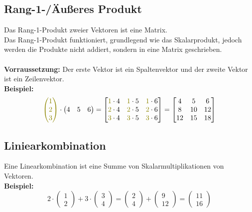\documentclass[12pt,a4paper]{article}
\begin{document}
\subsection{Rang-1-/Äußeres Produkt}
Das Rang-1-Produkt zweier Vektoren ist eine Matrix. \\
Das Rang-1-Produkt funktioniert, grundlegend wie das Skalarprodukt, jedoch werden die Produkte nicht addiert, sondern in eine Matrix geschrieben. \\ \\
\textbf{Vorraussetzung:} Der erste Vektor ist ein Spaltenvektor und der zweite Vektor ist ein Zeilenvektor. \\
\textbf{Beispiel:}
\[
    \textcolor{olive}{
    \begin{pmatrix}
        1 \\
        2 \\
        3
    \end{pmatrix}
    }
    \cdot
    \begin{pmatrix}
        4 & 5 & 6
    \end{pmatrix}
    =
    \begin{bmatrix}
        \textcolor{olive}{1} \cdot 4 & \textcolor{olive}{1} \cdot 5 & \textcolor{olive}{1} \cdot 6 \\
        \textcolor{olive}{2} \cdot 4 & \textcolor{olive}{2} \cdot 5 & \textcolor{olive}{2} \cdot 6 \\
        \textcolor{olive}{3} \cdot 4 & \textcolor{olive}{3} \cdot 5 & \textcolor{olive}{3} \cdot 6
    \end{bmatrix}
    =
    \begin{bmatrix}
        4 & 5 & 6 \\
        8 & 10 & 12 \\
        12 & 15 & 18
    \end{bmatrix}
\]

\subsection{Liniearkombination}
Eine Linearkombination ist eine Summe von Skalarmultiplikationen von Vektoren. \\
\textbf{Beispiel:}
\[
2 \cdot
\begin{pmatrix}
1 \\
2
\end{pmatrix}
+
3 \cdot
\begin{pmatrix}
3 \\
4
\end{pmatrix}
=
\begin{pmatrix}
2 \\
4
\end{pmatrix}
+
\begin{pmatrix}
9 \\
12
\end{pmatrix}
=
\begin{pmatrix}
11 \\
16
\end{pmatrix}
\]
\newpage
\end{document}
